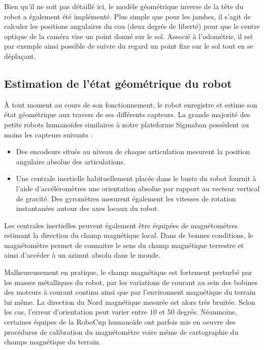 Bien qu'il ne soit pas détaillé ici, le modèle géométrique inverse 
de la tête du robot a également été implémenté.
Plus simple que pour les jambes, il s'agit de calculer les positions
angulaires du cou (deux degrés de liberté) pour que le centre optique 
de la caméra vise un point donné sur le sol.
Associé à l'odométrie, il est par exemple ainsi possible de suivre du regard 
un point fixe sur le sol tout en se déplaçant.

\subsection{Estimation de l'état géométrique du robot\label{sec:estimation_etat}}

À tout moment au cours de son fonctionnement, le robot enregistre 
et estime son état géométrique aux travers de ses différents capteurs.
La grande majorité des petits robots humanoïdes similaires à notre 
plateforme Sigmaban possèdent au moins les capteurs suivants :
\begin{itemize}
    \item Des encodeurs situés au niveau de chaque articulation
        mesurent la position angulaire absolue des articulations.
    \item Une centrale inertielle habituellement placée dans le buste
        du robot fournit à l'aide d'accéléromètres une orientation
        absolue par rapport au vecteur vertical de gravité.
        Des gyromètres mesurent également les vitesses de rotation
        instantanées autour des axes locaux du robot.
\end{itemize}

Les centrales inertielles peuvent également être équipées de 
magnétomètres estimant la direction du champ magnétique local. 
Dans de bonnes conditions, le magnétomètre permet de connaitre 
le sens du champ magnétique terrestre et ainsi d'accéder à un
azimut absolu dans le monde.

Malheureusement en pratique, le champ magnétique est fortement 
perturbé par les masses métalliques du robot, par les variations 
de courant au sein des bobines des moteurs à courant
continu ainsi que par l'environnent magnétique du terrain lui même. 
La direction du Nord magnétique mesurée est alors très bruitée.
Selon les cas, l'erreur d'orientation peut varier entre $10$ et $50$ degrés.
Néanmoins, certaines équipes de la RoboCup humanoïde ont parfois 
mis en oeuvre des procédures de calibration du magnétomètre
voire même de cartographie du champs magnétique du terrain.

